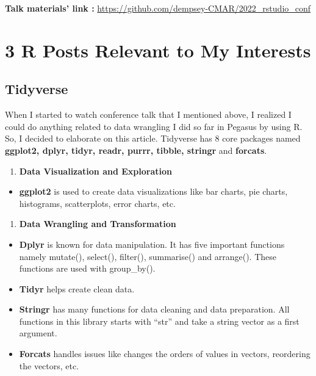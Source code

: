 \documentclass[
  letterpaper,
  DIV=11,
  numbers=noendperiod]{scrreprt}
\providecommand{\tightlist}{%
  \setlength{\itemsep}{0pt}\setlength{\parskip}{0pt}}\usepackage{longtable,booktabs,array}
\begin{document}
\textbf{Talk materials' link :}
\url{https://github.com/dempsey-CMAR/2022_rstudio_conf}


\hypertarget{r-posts-relevant-to-my-interests}{%
\chapter{3 R Posts Relevant to My
Interests}\label{r-posts-relevant-to-my-interests}}

\hypertarget{tidyverse}{%
\section{\texorpdfstring{\textbf{Tidyverse}}{Tidyverse}}\label{tidyverse}}

When I started to watch conference talk that I mentioned above, I
realized I could do anything related to data wrangling I did so far in
Pegasus by using R. So, I decided to elaborate on this article.
Tidyverse has 8 core packages named \textbf{ggplot2, dplyr, tidyr,
readr, purrr, tibble, stringr} and \textbf{forcats}.

\begin{enumerate}
\def\labelenumi{\arabic{enumi}.}
\tightlist
\item
  \textbf{Data Visualization and Exploration}
\end{enumerate}

\begin{itemize}
\tightlist
\item
  \textbf{ggplot2} is used to create data visualizations like bar
  charts, pie charts, histograms, scatterplots, error charts, etc.
\end{itemize}

\begin{enumerate}
\def\labelenumi{\arabic{enumi}.}
\setcounter{enumi}{1}
\tightlist
\item
  \textbf{Data Wrangling and Transformation}
\end{enumerate}

\begin{itemize}
\item
  \textbf{Dplyr} is known for data manipulation. It has five important
  functions namely mutate(), select(), filter(), summarise() and
  arrange(). These functions are used with group\_by().
\item
  \textbf{Tidyr} helps create clean data.
\item
  \textbf{Stringr} has many functions for data cleaning and data
  preparation. All functions in this library starts with ``str'' and
  take a string vector as a first argument.
\item
  \textbf{Forcats} handles issues like changes the orders of values in
  vectors, reordering the vectors, etc.
\end{itemize}
\end{document}
